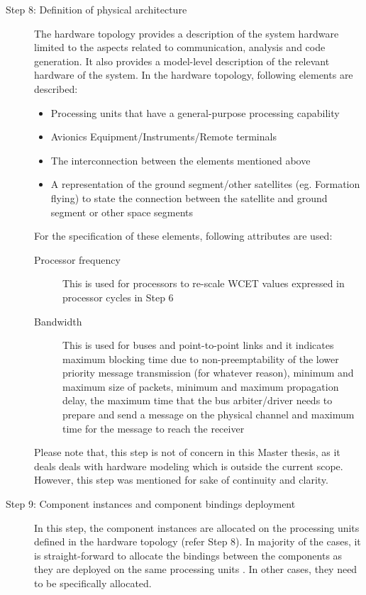 \begin{description}
\item [Step 8: Definition of physical architecture] The hardware topology provides a description of the system hardware limited to the aspects related to communication, analysis and code generation. It also provides a model-level description of the relevant hardware of the system. In the hardware topology, following elements are described:
\begin{itemize}
\item Processing units that have a general-purpose processing capability
\item Avionics Equipment/Instruments/Remote terminals
\item The interconnection between the elements mentioned above 
\item A representation of the ground segment/other satellites (eg. Formation flying) to state the connection between the satellite and ground segment or other space segments
\end{itemize}		
For the specification of these elements, following attributes are used:
\begin{description}
\item [Processor frequency] This is used for processors to re-scale WCET values expressed in processor cycles in Step 6
\item [Bandwidth] This is used for buses and point-to-point links and it indicates maximum blocking time due to non-preemptability of the lower priority message transmission (for whatever reason), minimum and maximum size of packets, minimum and maximum propagation delay, the maximum time that the bus arbiter/driver needs to prepare and send a message on the physical channel and maximum time for the message to reach the receiver    
\end{description}
Please note that, this step is not of concern in this Master thesis, as it deals deals with hardware modeling which is outside the current scope. However, this step was mentioned for sake of continuity and clarity.

\item [Step 9: Component instances and component bindings deployment] In this step, the component instances are allocated on the processing units defined in the hardware topology (refer Step 8). In majority of the cases, it is straight-forward to allocate the bindings between the components as they are deployed on the same processing units \cite{CompBasedProcess}. In other cases, they need to be specifically allocated.


\end{description}
